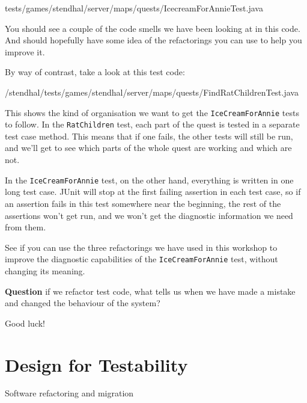 \documentclass[
]{book}
\newenvironment{Shaded}{\begin{snugshade}}{\end{snugshade}}
\newcommand{\FunctionTok}[1]{\textcolor[rgb]{0.00,0.00,0.00}{#1}}
\newcommand{\NormalTok}[1]{#1}
\begin{document}
\begin{Shaded}
\begin{Highlighting}[]
\NormalTok{tests/games/stendhal/server/maps/quests/IcecreamForAnnieTest.}\FunctionTok{java}
\end{Highlighting}
\end{Shaded}

You should see a couple of the code smells we have been looking at in this code. And should hopefully have some idea of the refactorings you can use to help you improve it.

By way of contrast, take a look at this test code:

\begin{Shaded}
\begin{Highlighting}[]
\NormalTok{/stendhal/tests/games/stendhal/server/maps/quests/FindRatChildrenTest.}\FunctionTok{java}
\end{Highlighting}
\end{Shaded}

This shows the kind of organisation we want to get the \texttt{IceCreamForAnnie} tests to follow. In the \texttt{RatChildren} test, each part of the quest is tested in a separate test case method. This means that if one fails, the other tests will still be run, and we'll get to see which parts of the whole quest are working and which are not.

In the \texttt{IceCreamForAnnie} test, on the other hand, everything is written in one long test case. JUnit will stop at the first failing assertion in each test case, so if an assertion fails in this test somewhere near the beginning, the rest of the assertions won't get run, and we won't get the diagnostic information we need from them.

See if you can use the three refactorings we have used in this workshop to improve the diagnostic capabilities of the \texttt{IceCreamForAnnie} test, without changing its meaning.

\textbf{Question} if we refactor test code, what tells us when we have made a mistake and changed the behaviour of the system?

Good luck!

\hypertarget{designing}{%
\chapter{Design for Testability}\label{designing}}

Software refactoring and migration
\end{document}
